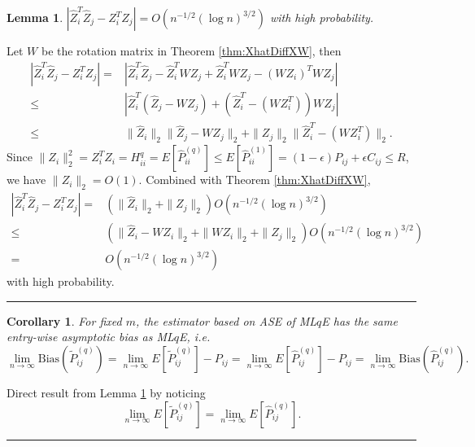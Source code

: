 \documentclass[a4paper]{article}
\newenvironment{proof}{{\bf Proof:  }}{\hfill\rule{2mm}{2mm}}
\newtheorem{lemma}[fact]{Lemma}
\newtheorem{corollary}[fact]{Corollary}
\begin{document}
\begin{lemma}
\label{lemma:1stMomentPhatDiffLq}
$\left|  \hat{Z}_i^T \hat{Z}_j - Z_i^T Z_j \right| = O(n^{-1/2} (\log n)^{3/2})$ with high probability.
\end{lemma}
\begin{proof}
Let $W$ be the rotation matrix in Theorem \ref{thm:XhatDiffXW}, then
\begin{align*}
	\left|  \hat{Z}_i^T \hat{Z}_j - Z_i^T Z_j \right|
    = & \left| \hat{Z}_i^T \hat{Z}_j - \hat{Z}_i^T W Z_j + \hat{Z}_i^T W Z_j - (W Z_i)^T W Z_j \right| \\
    \le & \left| \hat{Z}_i^T (\hat{Z}_j - W Z_j) + (\hat{Z}_i^T - (W Z_i^T)) W Z_j \right| \\
    \le & \|\hat{Z}_i\|_2 \|\hat{Z}_j - W Z_j\|_2 + \|Z_j\|_2 \|\hat{Z}_i^T - (W Z_i^T)\|_2.
\end{align*}
Since $\|Z_i\|_2^2 = Z_i^T Z_i = H^{q}_{ii} = E[\hat{P}^{(q)}_{ii}] \le E[\hat{P}^{(1)}_{ii}] = (1-\epsilon) P_{ij} + \epsilon C_{ij} \le R$, we have $\|Z_i\|_2 = O(1)$.
Combined with Theorem \ref{thm:XhatDiffXW},
\begin{align*}
    \left|  \hat{Z}_i^T \hat{Z}_j - Z_i^T Z_j \right|
    = & (\|\hat{Z}_i\|_2 + \|Z_j\|_2) O(n^{-1/2} (\log n)^{3/2}) \\
    \le & (\|\hat{Z}_i - W Z_i\|_2 + \|W Z_i\|_2 + \|Z_j\|_2) O(n^{-1/2} (\log n)^{3/2}) \\
    = & O(n^{-1/2} (\log n)^{3/2})
\end{align*}
with high probability.
\end{proof}




\begin{corollary}
\label{cor:LqConsistent}
For fixed $m$, the estimator based on ASE of ML$q$E has the same entry-wise asymptotic bias as ML$q$E, i.e.
\[
	\lim_{n \to \infty} \mathrm{Bias}(\widetilde{P}_{ij}^{(q)}) = \lim_{n \to \infty} E[\widetilde{P}_{ij}^{(q)}] - P_{ij} = \lim_{n \to \infty} E[\hat{P}^{(q)}_{ij}] - P_{ij}
    = \lim_{n \to \infty} \mathrm{Bias}(\hat{P}_{ij}^{(q)}).
\]
\end{corollary}
\begin{proof}
Direct result from Lemma \ref{lemma:1stMomentPhatDiffLq} by noticing
\[
	\lim_{n \to \infty} E[\widetilde{P}_{ij}^{(q)}] = \lim_{n \to \infty} E[\hat{P}^{(q)}_{ij}].
\]
\end{proof}
\end{document}
